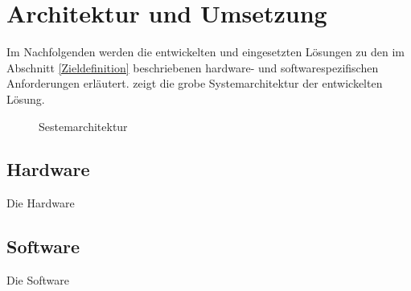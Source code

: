 \section{Architektur und Umsetzung}

Im Nachfolgenden werden die entwickelten und eingesetzten Lösungen zu den im Abschnitt \ref{Zieldefinition} beschriebenen hardware- und softwarespezifischen Anforderungen erläutert.  zeigt
die grobe Systemarchitektur der entwickelten Lösung.


\begin{figure}[htb]
\centering
{}
\caption{Sestemarchitektur}
\label{fig:DD}
\end{figure}

\subsection{Hardware}
Die Hardware

\subsection{Software}
Die Software

